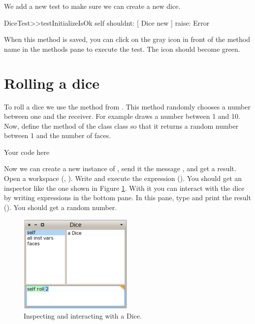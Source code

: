 \documentclass[a4paper,10pt,twoside]{book}
\begin{document}
We add a new test  to make sure we can create a new dice.


\begin{code}{}
DiceTest>>testInitializeIsOk
    self shouldnt: [ Dice new ] raise: Error
\end{code}


When this method is saved, you can click on the gray icon in front of the method name in the methods pane to execute the test. The icon should become green.
\section{ Rolling a dice}
To roll a dice we use the method   from . This method randomly chooses a
number between one and the receiver. For example  draws a number between 1 and 10.
Now, define the  method of the class  class so that it returns a random number between 1 and the number of faces.


\begin{code}{}
Your code here
\end{code}


Now we can create a new instance of , send it the message  , and get a result.
Open a workspace (, ). Write  and execute the expression (). You should get an inspector like the one shown in Figure \ref{figDiceNoDetail}. With it you can interact with the dice by writing expressions in the bottom pane. In this pane, type  and print the result (). You should get a random number.


\begin{figure}

\begin{center}
\includegraphics[width=0.5\textwidth]{figures/DiceNoDetail.pdf}\caption{Inspecting and interacting with a Dice.\label{figDiceNoDetail}}\end{center}
\end{figure}
\end{document}
